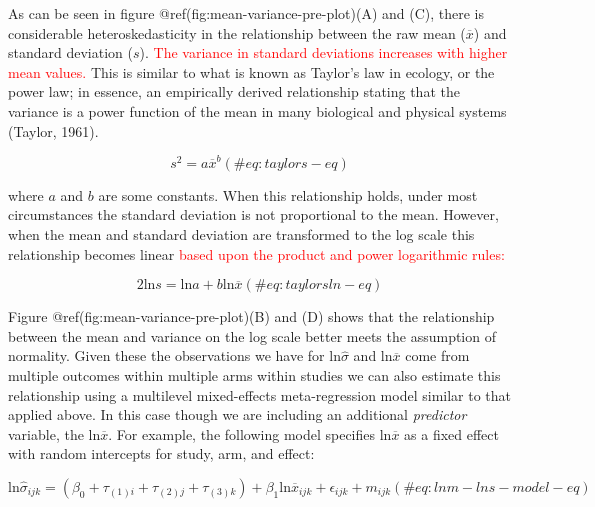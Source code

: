 \documentclass[
]{article}
\begin{document}
As can be seen in figure @ref(fig:mean-variance-pre-plot)(A) and (C), there is considerable heteroskedasticity in the relationship between the raw mean (\(\overline{x}\)) and standard deviation (\(s\)). \textcolor{red}{The variance in standard deviations increases with higher mean values.} This is similar to what is known as Taylor's law in ecology, or the power law; in essence, an empirically derived relationship stating that the variance is a power function of the mean in many biological and physical systems (Taylor, 1961).

\begin{equation}
s^2=a\overline{x}^b
(\#eq:taylors-eq)
\end{equation}

where \(a\) and \(b\) are some constants. When this relationship holds, under most circumstances the standard deviation is not proportional to the mean. However, when the mean and standard deviation are transformed to the log scale this relationship becomes linear \textcolor{red}{based upon the product and power logarithmic rules:}

\begin{equation}
2\textrm{ln}s=\textrm{ln}a+b\textrm{ln}\overline{x}
(\#eq:taylorsln-eq)
\end{equation}

Figure @ref(fig:mean-variance-pre-plot)(B) and (D) shows that the relationship between the mean and variance on the log scale better meets the assumption of normality. Given these the observations we have for \(\textrm{ln}\hat\sigma\) and \(\textrm{ln}\overline{x}\) come from multiple outcomes within multiple arms within studies we can also estimate this relationship using a multilevel mixed-effects meta-regression model similar to that applied above. In this case though we are including an additional \emph{predictor} variable, the \(\textrm{ln}\overline{x}\). For example, the following model specifies \(\textrm{ln}\overline{x}\) as a fixed effect with random intercepts for study, arm, and effect:

\begin{equation}
\textrm{ln}\hat\sigma_{ijk}=(\beta_{0}+\tau_{(1)i}+\tau_{(2)j}+\tau_{(3)k})+\beta_{1}\textrm{ln}\overline{x}_{ijk}+\epsilon_{ijk}+m_{ijk} 
(\#eq:lnm-lns-model-eq)
\end{equation}
\end{document}
